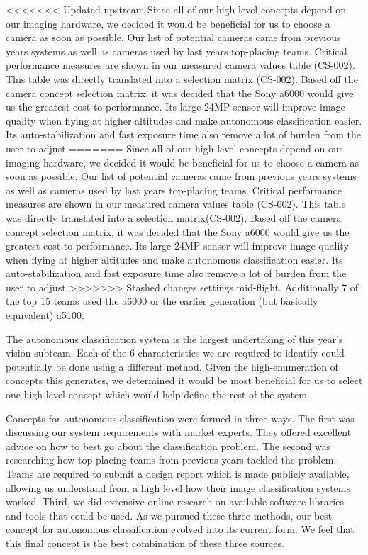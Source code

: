 \documentclass[]{auvsi_doc}
\begin{document}
<<<<<<< Updated upstream
Since all of our high-level concepts depend on our imaging hardware, we decided it would be beneficial for us to choose a camera as 
soon as possible. Our list of potential cameras came from previous years systems as well as cameras used by last years top-placing 
teams. Critical performance measures are shown in our measured camera values table (CS-002). This table was directly translated 
into a selection matrix (CS-002). Based off the camera concept selection matrix, it was decided that the Sony a6000 would give us 
the greatest cost to performance. Its large 24MP sensor will improve image quality when flying at higher altitudes and make 
autonomous classification easier. Its auto-stabilization and fast exposure time also remove a lot of burden from the user to adjust 
=======
Since all of our high-level concepts depend on our imaging hardware, we decided it would be beneficial for us to choose a camera as
soon as possible. Our list of potential cameras came from previous years systems as well as cameras used by last years top-placing
teams. Critical performance measures are shown in our measured camera values table (CS-002). This table was directly translated
into a selection matrix(CS-002). Based off the camera concept selection matrix, it was decided that the Sony a6000 would give us
the greatest cost to performance. Its large 24MP sensor will improve image quality when flying at higher altitudes and make
autonomous classification easier. Its auto-stabilization and fast exposure time also remove a lot of burden from the user to adjust
>>>>>>> Stashed changes
settings mid-flight. Additionally 7 of the top 15 teams used the a6000 or the earlier generation (but basically equivalent) a5100.

The autonomous classification system is the largest undertaking of this year's vision subteam. Each of the 6 characteristics we are
required to identify could potentially be done using a different method. Given the high-enumeration of concepts this generates, we
determined it would be most beneficial for us to select one high level concept which would help define the rest of the system.

Concepts for autonomous classification were formed in three ways. The first was discussing our system requirements with market experts.
They offered excellent advice on how to best go about the classification problem. The second was researching how top-placing teams from
previous years tackled the problem. Teams are required to submit a design report which is made publicly available, allowing us understand
from a high level how their image classification systems worked. Third, we did extensive online research on available software libraries
and tools that could be used. As we pursued these three methods, our best concept for autonomous classification evolved into its current
form. We feel that this final concept is the best combination of these three sources.
\end{document}

